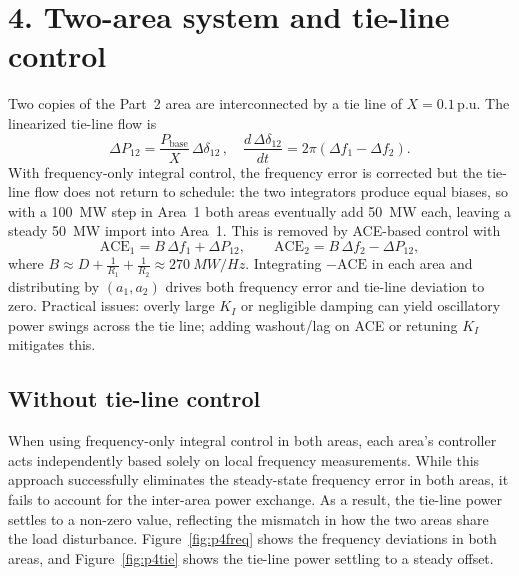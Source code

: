 \documentclass{article}
\begin{document}
\section*{4. Two-area system and tie-line control}
Two copies of the Part~2 area are interconnected by a tie line of $X=0.1$\,p.u. The linearized tie-line flow is
\[\Delta P_{12} = \frac{P_{\text{base}}}{X}\,\Delta \delta_{12}\,,\quad \frac{d\,\Delta \delta_{12}}{dt} = 2\pi(\Delta f_1 - \Delta f_2).\]
With frequency-only integral control, the frequency error is corrected but the tie-line flow does not return to schedule: the two integrators produce equal biases, so with a \SI{100}{MW} step in Area~1 both areas eventually add \SI{50}{MW} each, leaving a steady \SI{50}{MW} import into Area~1. This is removed by ACE-based control with
\[\text{ACE}_1 = B\,\Delta f_1 + \Delta P_{12},\qquad \text{ACE}_2 = B\,\Delta f_2 - \Delta P_{12},\]
where $B \approx D + \tfrac{1}{R_1}+\tfrac{1}{R_2} \approx \SI{270}{MW/Hz}$. Integrating $-\text{ACE}$ in each area and distributing by $(a_1,a_2)$ drives both frequency error and tie-line deviation to zero. Practical issues: overly large $K_I$ or negligible damping can yield oscillatory power swings across the tie line; adding washout/lag on ACE or retuning $K_I$ mitigates this.




\subsection*{Without tie-line control}
When using frequency-only integral control in both areas, each area's controller acts independently based solely on local frequency measurements. While this approach successfully eliminates the steady-state frequency error in both areas, it fails to account for the inter-area power exchange. As a result, the tie-line power settles to a non-zero value, reflecting the mismatch in how the two areas share the load disturbance. Figure~\ref{fig:p4freq} shows the frequency deviations in both areas, and Figure~\ref{fig:p4tie} shows the tie-line power settling to a steady offset.
\end{document}
